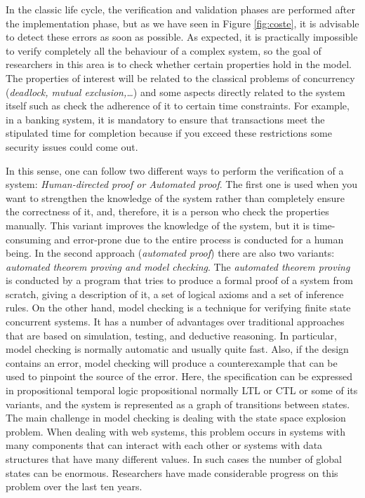 In the classic life cycle, the verification and validation phases are performed after the implementation phase, 
but as we have seen in Figure \ref{fig:coste}, it is advisable to detect these errors as soon as possible. 
As expected, it is practically impossible to verify completely all the behaviour of a complex 
system, so the goal of researchers in this area is to check whether certain properties hold in the model. 
The properties of interest will be related to the classical problems of concurrency (\emph{deadlock, mutual exclusion,\ldots}) 
and some aspects directly related to the system itself such as check 
the adherence of it to certain time constraints. For example, in a banking system, 
it is mandatory to ensure that transactions meet the stipulated time for completion 
because if you exceed these restrictions some security issues could come out.

In this sense, one can follow two different ways to perform 
the verification of a system: \emph{Human-directed proof or Automated proof}.
The first one is used when you want to strengthen the knowledge of the system 
rather than completely ensure the correctness of it, and, therefore, it is a person who check the properties manually. 
This variant improves the knowledge of the system, but it is time-consuming and 
error-prone due to the entire process is conducted for a human being. 
In the second approach (\emph{automated proof}) there are also two variants: \emph{automated theorem proving and model checking}. 
The \emph{automated theorem proving } is conducted by a program that tries 
to produce a formal proof of a system from scratch, giving a description of it, 
a set of logical axioms and a set of inference rules. On the other hand, model checking \cite{Clarke99} 
is a technique for verifying finite state concurrent systems. It has a number of advantages 
over traditional approaches that are based on simulation, testing, and deductive reasoning. 
In particular, model checking is normally automatic and usually quite fast. Also, if the design contains an error, 
model checking will produce a counterexample that can be used to pinpoint the source of the error. 
Here, the specification can be expressed in propositional temporal logic propositional 
normally LTL \cite{Pnueli77} or CTL \cite{Henzinger94} or some of its variants, 
and the system is represented as a graph of transitions between states. 
The main challenge in model checking is dealing with the state space explosion problem. 
When dealing with web systems, this problem occurs in systems with many components that can interact with 
each other or systems with data structures that have many different values. 
In such cases the number of global states can be enormous. 
Researchers have made considerable progress on this problem over the last ten years. 

